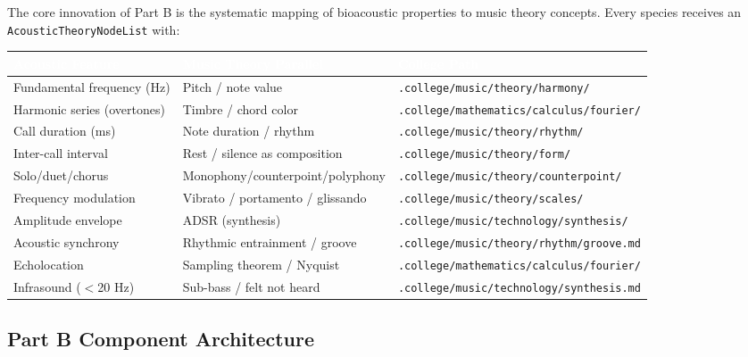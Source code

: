 \documentclass[11pt,letterpaper]{article}
\newcommand{\tblhdr}[1]{\textbf{\sffamily\textcolor{white}{#1}}}
\begin{document}
The core innovation of Part B is the systematic mapping of bioacoustic properties to
music theory concepts. Every species receives an \texttt{AcousticTheoryNodeList} with:

\begin{center}
\begin{tabularx}{\textwidth}{L{4cm}XL{4.5cm}}
\toprule
{}
\tblhdr{Acoustic Feature} & \tblhdr{Music Theory Parallel} & \tblhdr{College Path} \\
\midrule
Fundamental frequency (Hz) & Pitch / note value & \texttt{.college/music/theory/harmony/} \\
Harmonic series (overtones) & Timbre / chord color & \texttt{.college/mathematics/calculus/fourier/} \\
Call duration (ms) & Note duration / rhythm & \texttt{.college/music/theory/rhythm/} \\
Inter-call interval & Rest / silence as composition & \texttt{.college/music/theory/form/} \\
Solo/duet/chorus & Monophony/counterpoint/polyphony & \texttt{.college/music/theory/counterpoint/} \\
Frequency modulation & Vibrato / portamento / glissando & \texttt{.college/music/theory/scales/} \\
Amplitude envelope & ADSR (synthesis) & \texttt{.college/music/technology/synthesis/} \\
Acoustic synchrony & Rhythmic entrainment / groove & \texttt{.college/music/theory/rhythm/groove.md} \\
Echolocation & Sampling theorem / Nyquist & \texttt{.college/mathematics/calculus/fourier/} \\
Infrasound ($<$20 Hz) & Sub-bass / felt not heard & \texttt{.college/music/technology/synthesis.md} \\
\bottomrule
\end{tabularx}
\end{center}

\subsection{Part B Component Architecture}
\end{document}
